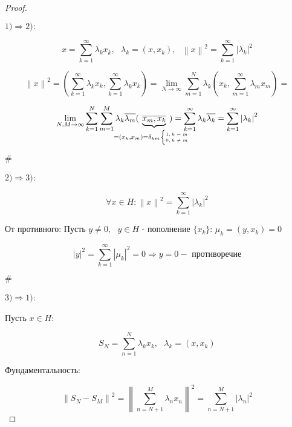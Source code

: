 \documentclass[12pt, a4paper]{report}
\begin{document}
\begin{proof}
    \[  \] 

    \( 1) \Rightarrow  2): \) 

    \[ x = \sum_{k =1} ^{ \infty  } \lambda_k x_k , \text{ } \lambda_k = (x,x_k) , \text{ }  \left\lVert x  \right\rVert    ^2 = \sum_{k =1}^{\infty  } \left\lvert \lambda_k \right\rvert  ^2  \] 

    \[ \left\lVert  x  \right\rVert ^2 = \left(  \sum_{k =1} ^{ \infty  } \lambda_k x_k, \sum_{k =1} ^{ \infty  } \lambda_k x_k  \right) = \lim_{N \to \infty} \sum_{m=1}^{N } \lambda_k \left( x_k, \sum_{m =1} ^{\infty } \lambda_m x_m \right) =\] 

    \[ \lim_{N,M  \to \infty}  \sum_{k =1}^{ N } \sum_{m =1}^{ M }  \lambda_k \overline{\lambda_m } (\kern-30pt \underbrace{\overline{x_m, x_k}}_{= (x_k, x_m) =\delta_{km}  {\tiny\begin{cases} 1, k=m \\ 0 , k\neq m \end{cases}}}\kern-30pt  )  = \sum_{k =1} ^{ \infty  } \lambda_k \overline{\lambda_k } = \sum_{k =1} ^{ \infty  } \left\lvert \lambda_k \right\rvert  ^2  \] 

    \begin{flushright}
        \(  \# \) 
    \end{flushright}

    \( 2) \Rightarrow 3) \):

    \[ \forall  x \in  H : \left\lVert  x  \right\rVert  ^2 = \sum_{k =1}^{\infty  } \left\lvert \lambda_k \right\rvert ^2   \] 

    От противного: Пусть \( y \neq 0 , \text{ } y \in  H \)  - пополнение \( \{x_k\} \): \( \mu_k = (y, x_k) = 0 \) 

    \[ \left\lvert y  \right\rvert  ^2 = \sum_{k =1} ^{\infty  } \left\lvert \mu_k \right\rvert ^2 = 0 \Rightarrow y = 0 - \text{ противоречие}  \] 

    \begin{flushright}
        \(  \# \) 
    \end{flushright}

    \( 3) \Rightarrow 1) \):

    Пусть \( x \in  H  \): 

    \[  S_N = \sum_{n =1}^{N }  \lambda_k x_k , \text{ } \lambda_k = (x, x_k)  \] 

    Фундаментальность: 

    \[ \left\lVert S_N - S_M         \right\rVert  ^2 = \left\lVert \sum_{n =N +1 } ^{M } \lambda_n x_n           \right\rVert ^2 = \sum _{n =N +1 } ^{M } \left\lvert \lambda_n \right\rvert ^2 \] 


\end{proof}
\end{document}
